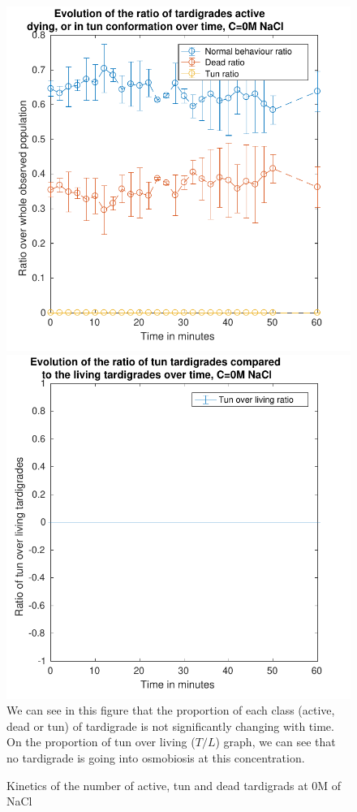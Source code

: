 \documentclass[12pt,a4paper, twocolumn]{article}
\begin{document}
\begin{figure}
\includegraphics[width=\linewidth]{000.pdf}
\includegraphics[width=\linewidth]{000t.pdf}
\label{fig000}
We can see in this figure that the proportion of each class (active, dead or tun) of tardigrade is not significantly changing with time. On the proportion of tun over living ($T/L$) graph, we can see that no tardigrade is going into osmobiosis at this concentration.
\caption{Kinetics of the number of active, tun and dead tardigrads at 0M of NaCl}
\end{figure}
\end{document}

